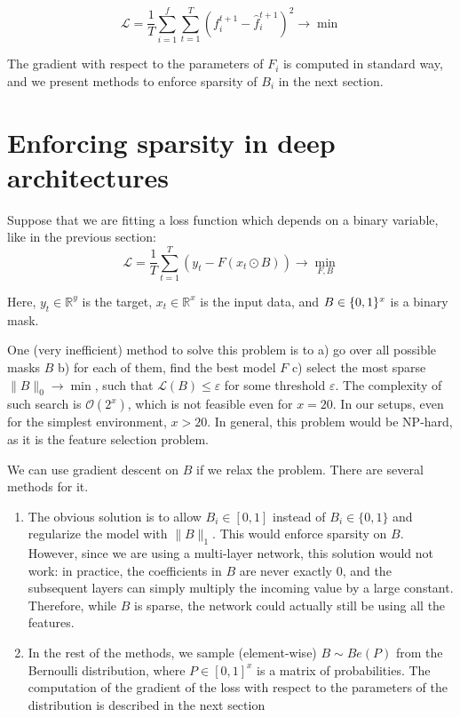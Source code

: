 \documentclass[a4paper,11pt,oneside]{report}
\begin{document}
$$
\mathcal L=\frac{1}{T}\sum\limits_{i=1}^f\sum\limits_{t=1}^T \left(f^{t+1}_i-\hat{f}_i^{t+1}\right)^2\to\min
$$

The gradient with respect to the parameters of $F_i$ is computed in standard way, and we present methods to enforce sparsity of $B_i$ in the next section.

\section{Enforcing sparsity in deep architectures}
\label{sec:sparse_deep}
Suppose that we are fitting a loss function which depends on a binary variable, like in the previous section:
$$
\mathcal L=\frac{1}{T}\sum\limits_{t=1}^T(y_t-F(x_t\odot B))\to\min\limits_{F,B}
$$

Here, $y_t\in\mathbb R^y$ is the target, $x_t\in\mathbb R^x$ is the input data, and $B\in\mathbb \{0,1\}^x$ is a binary mask.

One (very inefficient) method to solve this problem is to a) go over all possible masks $B$ b) for each of them, find the best model $F$ c) select the most sparse $\|B\|_0\to\min$, such that $\mathcal L(B)\leq\varepsilon$ for some threshold $\varepsilon$. The complexity of such search is $\mathcal O(2^x)$, which is not feasible even for $x=20$. In our setups, even for the simplest environment, $x>20$. In general, this problem would be NP-hard, as it is the feature selection problem.

We can use gradient descent on $B$ if we relax the problem. There are several methods for it.
\begin{enumerate}
    \item The obvious solution is to allow $B_i\in[0,1]$ instead of $B_i\in\{0,1\}$ and regularize the model with $\|B\|_1$\cite{Tank2017}. This would enforce sparsity on $B$. However, since we are using a multi-layer network, this solution would not work: in practice, the coefficients in $B$ are never exactly $0$, and the subsequent layers can simply multiply the incoming value by a large constant. Therefore, while $B$ is sparse, the network could actually still be using all the features.
    \item In the rest of the methods, we sample (element-wise) $B\sim Be(P)$ from the Bernoulli distribution, where $P\in[0,1]^x$ is a matrix of probabilities. The computation of the gradient of the loss with respect to the parameters of the distribution is described in the next section
\end{enumerate}
\end{document}

